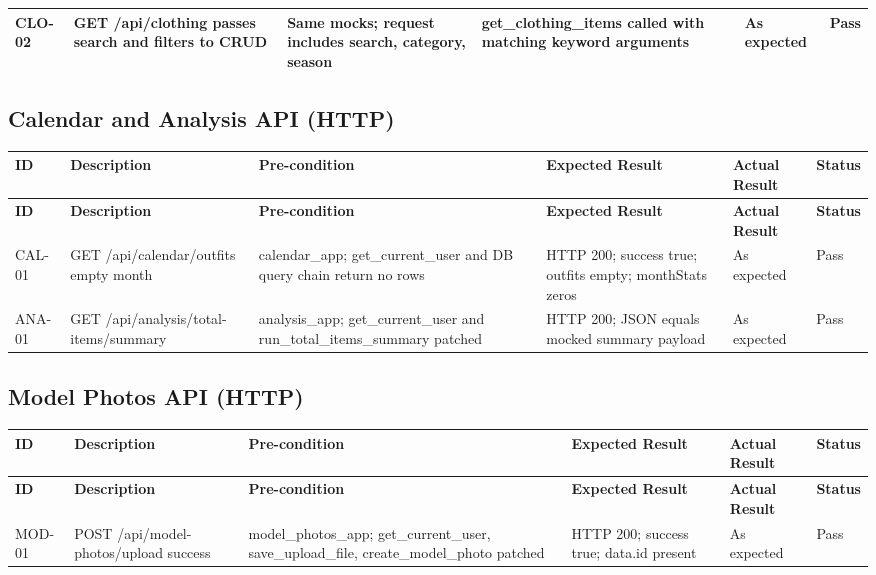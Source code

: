 \begin{appendices}
{\begin{longtable}{|p{1.2cm}|p{3.0cm}|p{3.0cm}|p{3.2cm}|p{2.2cm}|p{1.1cm}|}
CLO-02 &
GET /api/clothing passes search and filters to CRUD &
Same mocks; request includes search, category, season &
get\_clothing\_items called with matching keyword arguments &
As expected &
Pass \\
\hline
\end{longtable}

\subsection*{Calendar and Analysis API (HTTP)}
\begin{longtable}{|p{1.2cm}|p{3.0cm}|p{3.0cm}|p{3.2cm}|p{2.2cm}|p{1.1cm}|}
\hline
\textbf{ID} & \textbf{Description} & \textbf{Pre-condition} & \textbf{Expected Result} & \textbf{Actual Result} & \textbf{Status} \\
\hline
\endfirsthead
\hline
\textbf{ID} & \textbf{Description} & \textbf{Pre-condition} & \textbf{Expected Result} & \textbf{Actual Result} & \textbf{Status} \\
\hline
\endhead
\hline
\endfoot

CAL-01 &
GET /api/calendar/outfits empty month &
calendar\_app; get\_current\_user and DB query chain return no rows &
HTTP 200; success true; outfits empty; monthStats zeros &
As expected &
Pass \\
\hline

ANA-01 &
GET /api/analysis/total-items/summary &
analysis\_app; get\_current\_user and run\_total\_items\_summary patched &
HTTP 200; JSON equals mocked summary payload &
As expected &
Pass \\
\hline

\end{longtable}

\subsection*{Model Photos API (HTTP)}
\begin{longtable}{|p{1.2cm}|p{3.0cm}|p{3.0cm}|p{3.2cm}|p{2.2cm}|p{1.1cm}|}
\hline
\textbf{ID} & \textbf{Description} & \textbf{Pre-condition} & \textbf{Expected Result} & \textbf{Actual Result} & \textbf{Status} \\
\hline
\endfirsthead
\hline
\textbf{ID} & \textbf{Description} & \textbf{Pre-condition} & \textbf{Expected Result} & \textbf{Actual Result} & \textbf{Status} \\
\hline
\endhead
\hline
\endfoot

MOD-01 &
POST /api/model-photos/upload success &
model\_photos\_app; get\_current\_user, save\_upload\_file, create\_model\_photo patched &
HTTP 200; success true; data.id present &
As expected &
Pass \\
\hline


\end{longtable}}
\end{appendices}
